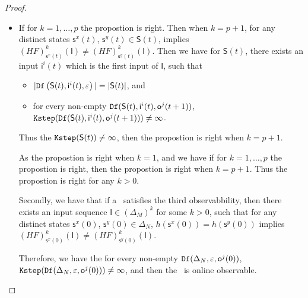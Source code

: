 \begin{appendices}
\begin{proof}
\begin{itemize}
\item If for $k=1,\ldots, p$ the propostion is right. Then when $k=p+1$, for any distinct states $\mathsf{s}^{x}(t)$, $\mathsf{s}^{y}(t) \in \mathsf{S}(t)$, implies $(HF)^{k}_{\mathsf{s}^{x}(t)}(\mathsf{I})\neq (HF)^{k}_{\mathsf{s}^{y}(t)}(\mathsf{I})$. Then we have for $\mathsf{S}(t)$,
 there exists an input $\mathsf{i}^{i}(t)$ which is the first input of $\mathsf{I}$, such that
 \begin{itemize}
\item  $|{\tt Df}\left(\mathsf{S}(t),\mathsf{i}^{i}(t),\varepsilon\right)|=|\mathsf{S}(t)|$, and 
 \item  for every non-empty ${\tt Df}(\mathsf{S}(t),\mathsf{i}^{i}(t),\mathsf{o}^{j}(t+1))$, ${\tt Kstep}({\tt Df}(\mathsf{S}(t),\mathsf{i}^{i}(t),\mathsf{o}^{j}(t+1)))\ne \infty$.
 \end{itemize}
Thus the ${\tt Kstep}(\mathsf{S}(t))\ne \infty$, then the propostion is right when $k =p+1$.

As the propostion is right when $k =1$, and we have if for $k=1,\ldots, p$ the propostion is right, then the propostion is right when $k=p+1$. Thus the propostion is right for any $k>0$.

Secondly, we have that if a \BCN\ satisfies the third observabbility, then there exists an input sequence $\mathsf{I}\in(\Delta_M)^{k}$ for some $k >0$, such that for any distinct states $\mathsf{s}^{x}(0)$, $\mathsf{s}^{y}(0) \in \Delta_N$, $h(\mathsf{s}^{x}(0))=h(\mathsf{s}^{y}(0))$ implies $(HF)^{k}_{\mathsf{s}^{x}(0)}(\mathsf{I})\neq (HF)^{k}_{\mathsf{s}^{y}(0)}(\mathsf{I})$. 

Therefore, we have the for every non-empty ${\tt Df}(\Delta_N,\varepsilon, \mathsf{o}^{j}(0))$, ${\tt Kstep}({\tt Df}(\Delta_N,\varepsilon,\mathsf{o}^{j}(0)))\ne \infty$, and then the \BCN\ is online observable.
 \end{itemize}
\end{proof}

\end{appendices}
